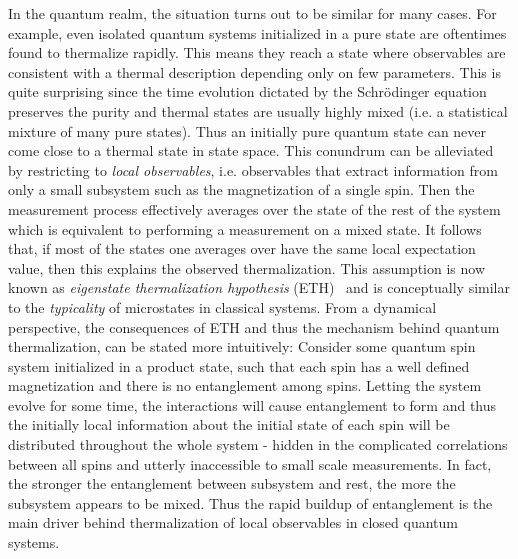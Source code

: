 In the quantum realm, the situation turns out to be similar for many cases. For example, even isolated quantum systems initialized in a pure state are oftentimes found to thermalize rapidly. This means they reach a state where observables are consistent with a thermal description depending only on few parameters. This is quite surprising since the time evolution dictated by the Schrödinger equation preserves the purity and thermal states are usually highly mixed (i.e. a statistical mixture of many pure states). Thus an initially pure quantum state can never come close to a thermal state in state space. 
This conundrum can be alleviated by restricting to \emph{local observables}, i.e. observables that extract information from only a small subsystem such as the magnetization of a single spin. Then the measurement process effectively averages over the state of the rest of the system which is equivalent to performing a measurement on a mixed state. 
It follows that, if most of the states one averages over have the same local expectation value, then this explains the observed thermalization. This assumption is now known as \emph{eigenstate thermalization hypothesis} (ETH)~\cite{deutschQuantumStatisticalMechanics1991,srednickiChaosQuantumThermalization1994, deutschEigenstateThermalizationHypothesis2018} and is conceptually similar to the \emph{typicality} of microstates in classical systems.
From a dynamical perspective, the consequences of ETH and thus the mechanism behind quantum thermalization, can be stated more intuitively: Consider some quantum spin system initialized in a product state, such that each spin has a well defined magnetization and there is no entanglement among spins. Letting the system evolve for some time, the interactions will cause entanglement to form and thus the initially local information about the initial state of each spin will be distributed throughout the whole system - hidden in the complicated correlations between all spins and utterly inaccessible to small scale measurements. In fact, 
the stronger the entanglement between subsystem and rest, the more the subsystem appears to be mixed.
Thus the rapid buildup of entanglement is the main driver behind thermalization of local observables in closed quantum systems.

